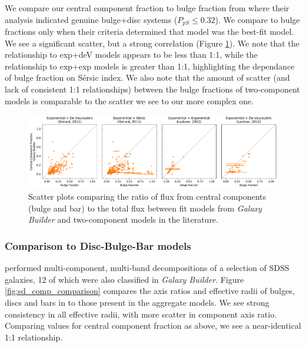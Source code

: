 \documentclass[../main.tex]{subfiles}
\begin{document}
We compare our central component fraction to bulge fraction from \citet{2011ApJS..196...11S} where their analysis indicated genuine bulge+disc systems ($P_{pS} \le 0.32$). We compare to \citet{2012MNRAS.421.2277L} bulge fractions only when their criteria determined that model was the best-fit model. We see a significant scatter, but a strong correlation (Figure \ref{fig:bulge_fractions}). We note that the relationship to exp+deV models appears to be less than 1:1, while the relationship to exp+exp models is greater than 1:1, highlighting the dependance of bulge fraction on S\'ersic index. We also note that the amount of scatter (and lack of consistent 1:1 relationships) between the bulge fractions of two-component models is comparable to the scatter we see to our more complex one.


\begin{figure}
  \includegraphics[width=17.3cm]{images__results/bulge_fraction_scatter_reduced.pdf}
  \caption{Scatter plots comparing the ratio of flux from central components (bulge and bar) to the total flux between fit models from \textit{Galaxy Builder} and two-component models in the literature.}
  \label{fig:bulge_fractions}
\end{figure}


\subsubsection{Comparison to Disc-Bulge-Bar models}

\citet{2018MNRAS.473.4731K} performed multi-component, multi-band decompositions of a selection of SDSS galaxies, 12 of which were also classified in \textit{Galaxy Builder}. Figure \ref{fig:sd_comp_comparison} compares the axis ratios and effective radii of bulges, discs and bars in \citet{2018MNRAS.473.4731K} to those present in the aggregate models. We see strong consistency in all effective radii, with more scatter in component axis ratio. Comparing values for central component fraction as above, we see a near-identical 1:1 relationship.
\end{document}

